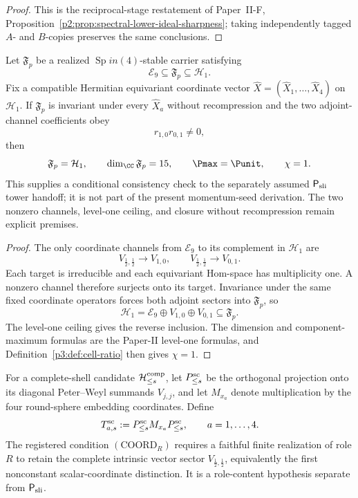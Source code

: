 \documentclass[11pt,a4paper]{article}
\begin{document}
\begin{proof}
This is the reciprocal-stage restatement of Paper~II-F,
Proposition~\ref{p2:prop:spectral-lower-ideal-sharpness}; taking independently
tagged \(A\)- and \(B\)-copies preserves the same conclusions.
\end{proof}

\begin{corollary}
\label{p3b:cor:fixed-action-full-carrier-selector}
Let \(\mathfrak F_p\) be a realized \(\operatorname{Sp}in(4)\)-stable carrier satisfying
\[
 \mathcal E_9\subseteq\mathfrak F_p\subseteq\mathcal H_1.
\]
Fix a compatible Hermitian equivariant coordinate vector
\(\widehat X=(\widehat X_1,\ldots,\widehat X_4)\) on \(\mathcal H_1\).
If \(\mathfrak F_p\) is invariant under every \(\widehat X_a\) without
recompression and the two adjoint-channel coefficients obey
\[
 r_{1,0}r_{0,1}\ne0,
\]
then
\[
 \mathfrak F_p=\mathcal H_1,
 \qquad
 \dim_{\CC}\mathfrak F_p=15,
 \qquad
 \Pmax=\Punit,
 \qquad
 \chi=1.
\]
This supplies a conditional consistency check to the separately assumed \(\mathsf P_{\rm sli}\) tower handoff; it is not part of the present momentum-seed derivation.  The two nonzero channels, level-one ceiling, and
closure without recompression remain explicit premises.
\end{corollary}

\begin{proof}
The only coordinate channels from \(\mathcal E_9\) to its complement in
\(\mathcal H_1\) are
\[
 V_{\frac12,\frac12}\longrightarrow V_{1,0},
 \qquad
 V_{\frac12,\frac12}\longrightarrow V_{0,1}.
\]
Each target is irreducible and each equivariant Hom-space has multiplicity
one.  A nonzero channel therefore surjects onto its target.  Invariance under
the same fixed coordinate operators forces both adjoint sectors into
\(\mathfrak F_p\), so
\[
 \mathcal H_1
 =\mathcal E_9\oplus V_{1,0}\oplus V_{0,1}
 \subseteq\mathfrak F_p.
\]
The level-one ceiling gives the reverse inclusion.  The dimension and
component-maximum formulas are the Paper-II level-one formulas, and
Definition~\ref{p3:def:cell-ratio} then gives \(\chi=1\).
\end{proof}

\begin{definition}
\label{p3b:def:scalar-coordinate-tests}
For a complete-shell candidate \(\mathcal H_{\le s}^{\rm comp}\), let
\(P^{\rm sc}_{\le s}\) be the orthogonal projection onto its diagonal
Peter--Weyl summands \(V_{j,j}\), and let \(M_{x_a}\) denote multiplication
by the four round-sphere embedding coordinates.  Define
\[
 T^{\rm sc}_{a,s}
 :=P^{\rm sc}_{\le s}M_{x_a}P^{\rm sc}_{\le s},
 \qquad a=1,\ldots,4.
\]
The registered condition \((\mathrm{COORD}_R)\) requires a faithful finite
realization of role \(R\) to retain the complete intrinsic vector sector
\(V_{\frac12,\frac12}\), equivalently the first nonconstant scalar-coordinate
distinction.  It is a role-content hypothesis separate from
\(\mathsf P_{\rm sli}\).
\end{definition}
\end{document}
